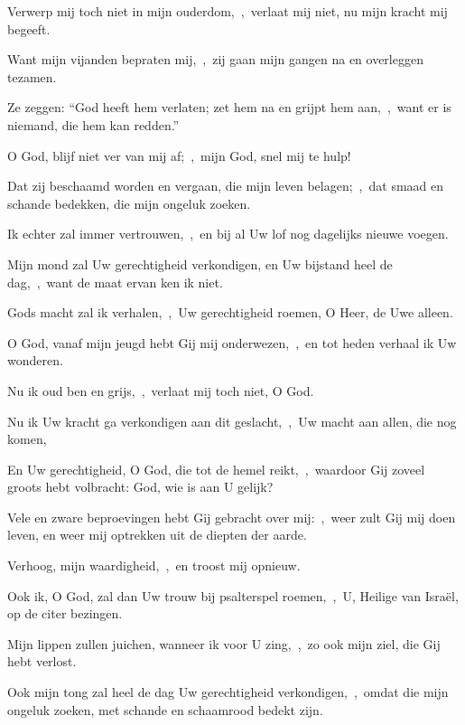 \documentclass[12pt,twoside,a5paper]{article}
\begin{document}
\begin{halfparskip}
  Verwerp mij toch niet in mijn ouderdom,~\sep\ verlaat mij niet, nu mijn kracht mij begeeft.

  Want mijn vijanden bepraten mij,~\sep\ zij gaan mijn gangen na en overleggen tezamen.

  Ze zeggen: ``God heeft hem verlaten; zet hem na en grijpt hem aan,~\sep\ want er is niemand, die hem kan redden.''

  O God, blijf niet ver van mij af;~\sep\ mijn God, snel mij te hulp!

  Dat zij beschaamd worden en vergaan, die mijn leven belagen;~\sep\ dat smaad en schande bedekken, die mijn ongeluk zoeken.

  Ik echter zal immer vertrouwen,~\sep\ en bij al Uw lof nog dagelijks nieuwe voegen.

  Mijn mond zal Uw gerechtigheid verkondigen, en Uw bijstand heel de dag,~\sep\ want de maat ervan ken ik niet.

  Gods macht zal ik verhalen,~\sep\ Uw gerechtigheid roemen, O Heer, de Uwe alleen.
\end{halfparskip}


\begin{halfparskip}
  O God, vanaf mijn jeugd hebt Gij mij onderwezen,~\sep\ en tot heden verhaal ik Uw wonderen.

  Nu ik oud ben en grijs,~\sep\ verlaat mij toch niet, O God.

  Nu ik Uw kracht ga verkondigen aan dit geslacht,~\sep\ Uw macht aan allen, die nog komen,

  En Uw gerechtigheid, O God, die tot de hemel reikt,~\sep\ waardoor Gij zoveel groots hebt volbracht: God, wie is aan U gelijk?

  Vele en zware beproevingen hebt Gij gebracht over mij:~\sep\ weer zult Gij mij doen leven, en weer mij optrekken uit de diepten der aarde.

  Verhoog, mijn waardigheid,~\sep\ en troost mij opnieuw.

  Ook ik, O God, zal dan Uw trouw bij psalterspel roemen,~\sep\ U, Heilige van Israël, op de citer bezingen.

  Mijn lippen zullen juichen, wanneer ik voor U zing,~\sep\ zo ook mijn ziel, die Gij hebt verlost.

  Ook mijn tong zal heel de dag Uw gerechtigheid verkondigen,~\sep\ omdat die mijn ongeluk zoeken, met schande en schaamrood bedekt zijn.
\end{halfparskip}
\end{document}
